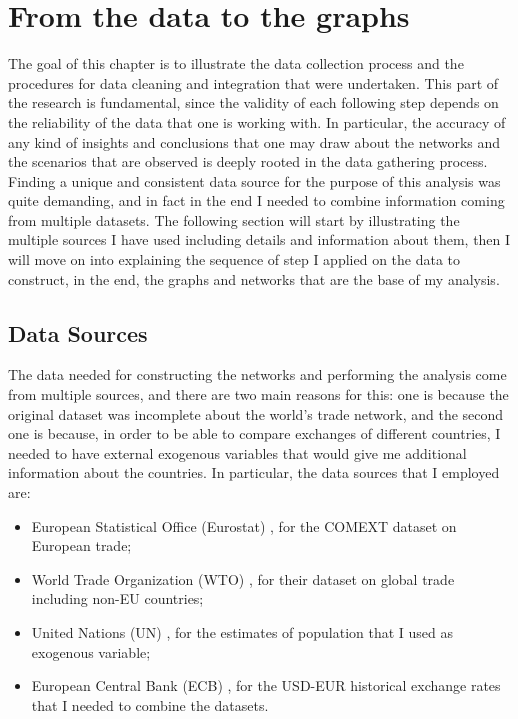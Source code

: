 
\chapter{From the data to the graphs}
The goal of this chapter is to illustrate the data collection process and the procedures for data cleaning and integration that were undertaken. This part of the research is fundamental, since the validity of each following step depends on the reliability of the data that one is working with. In particular, the accuracy of any kind of insights and conclusions that one may draw about the networks and the scenarios that are observed is deeply rooted in the data gathering process.
Finding a unique and consistent data source for the purpose of this analysis was quite demanding, and in fact in the end I needed to combine information coming from multiple datasets. The following section will start by illustrating the multiple sources I have used including details and information about them, then I will move on into explaining the sequence of step I applied on the data to construct, in the end, the graphs and networks that are the base of my analysis.

\section{Data Sources}

The data needed for constructing the networks and performing the analysis come from multiple sources, and there are two main reasons for this: one is because the original dataset was incomplete about the world's trade network, and the second one is because, in order to be able to compare exchanges of different countries, I needed to have external exogenous variables that would give me additional information about the countries. In particular, the data sources that I employed are:
\begin{itemize}
    \item European Statistical Office (Eurostat) \cite{eurostat2022comext}, for the COMEXT dataset on European trade;
    \item World Trade Organization (WTO) \cite{wto2022stats}, for their dataset on global trade including non-EU countries;
    \item United Nations (UN) \cite{un2022population}, for the estimates of population that I used as exogenous variable;
    \item European Central Bank (ECB) \cite{ecb2021usdeur}, for the USD-EUR historical exchange rates that I needed to combine the datasets.
\end{itemize}

